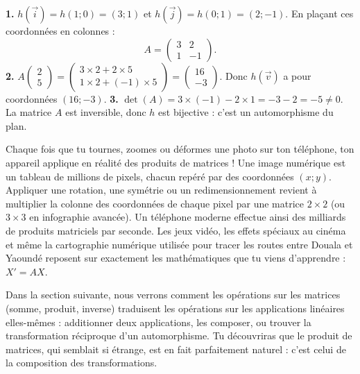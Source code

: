 \documentclass[11pt]{article}
\begin{document}
\begin{corrige}
\textbf{1.} $h(\vec{i}) = h(1 ; 0) = (3 ; 1)$ et $h(\vec{j}) = h(0 ; 1) = (2 ; -1)$. En plaçant ces coordonnées en colonnes :
\[ A = \begin{pmatrix} 3 & 2 \\ 1 & -1 \end{pmatrix}. \]
\textbf{2.} $A \begin{pmatrix} 2 \\ 5 \end{pmatrix} = \begin{pmatrix} 3\times 2 + 2\times 5 \\ 1\times 2 + (-1)\times 5 \end{pmatrix} = \begin{pmatrix} 16 \\ -3 \end{pmatrix}$. Donc $h(\vec{v})$ a pour coordonnées $(16 ; -3)$.
\textbf{3.} $\det(A) = 3\times(-1) - 2\times 1 = -3 - 2 = -5 \neq 0$. La matrice $A$ est inversible, donc $h$ est bijective : c'est un automorphisme du plan.
\end{corrige}

\begin{savaistu}
Chaque fois que tu tournes, zoomes ou déformes une photo sur ton téléphone, ton appareil applique en réalité des produits de matrices ! Une image numérique est un tableau de millions de pixels, chacun repéré par des coordonnées $(x ; y)$. Appliquer une rotation, une symétrie ou un redimensionnement revient à multiplier la colonne des coordonnées de chaque pixel par une matrice $2\times 2$ (ou $3\times 3$ en infographie avancée). Un téléphone moderne effectue ainsi des milliards de produits matriciels par seconde. Les jeux vidéo, les effets spéciaux au cinéma et même la cartographie numérique utilisée pour tracer les routes entre Douala et Yaoundé reposent sur exactement les mathématiques que tu viens d'apprendre : $X' = AX$.
\end{savaistu}

Dans la section suivante, nous verrons comment les opérations sur les matrices (somme, produit, inverse) traduisent les opérations sur les applications linéaires elles-mêmes : additionner deux applications, les composer, ou trouver la transformation réciproque d'un automorphisme. Tu découvriras que le produit de matrices, qui semblait si étrange, est en fait parfaitement naturel : c'est celui de la composition des transformations.
\end{document}
